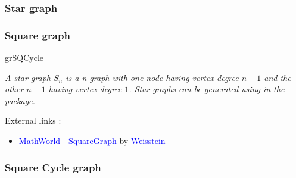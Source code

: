 \SetUpEdge[style={thick,%
           double          = orange,%
           double distance = 1pt}]
\SetVertexNoLabel
{}

\subsubsection{Star graph}
\begin{center}
  \begin{tkzexample}[vbox]
\end{tkzexample}
\end{center}

\newpage 
\subsubsection{Square graph} 

 \begin{NewMacroBox}{grSQCycle}{}

\medskip
\emph{A star graph $S_n$ is a n-graph   with one node having vertex degree $n-1$  and the other $n-1$   having vertex degree $1$. Star graphs can be generated using  in   the  package.}

\medskip
External links :

\medskip
\begin{itemize}
\item \href{http://mathworld.wolfram.com/SquareGraph.html}%
           {\textcolor{blue}{MathWorld - SquareGraph}} by %
      \href{http://en.wikipedia.org/wiki/Eric_W._Weisstein}%
           {\textcolor{blue}{Weisstein}}
\end{itemize}
\end{NewMacroBox}

\subsubsection{Square Cycle graph}
\begin{center}
\begin{tkzexample}[vbox]
\end{tkzexample}
\end{center}

